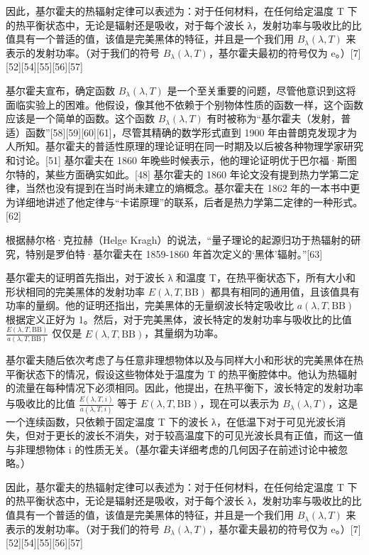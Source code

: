 因此，基尔霍夫的热辐射定律可以表述为：对于任何材料，在任何给定温度 T 下的热平衡状态中，无论是辐射还是吸收，对于每个波长 λ，发射功率与吸收比的比值具有一个普适的值，该值是完美黑体的特征，并且是一个我们用 \( B_\lambda (\lambda, T) \) 来表示的发射功率。（对于我们的符号 \( B_\lambda (\lambda, T) \)，基尔霍夫最初的符号仅为 e。）[7][52][54][55][56][57]

基尔霍夫宣布，确定函数 \( B_\lambda (\lambda, T) \) 是一个至关重要的问题，尽管他意识到这将面临实验上的困难。他假设，像其他不依赖于个别物体性质的函数一样，这个函数应该是一个简单的函数。这个函数 \( B_\lambda (\lambda, T) \) 有时被称为“基尔霍夫（发射，普适）函数”[58][59][60][61]，尽管其精确的数学形式直到 1900 年由普朗克发现才为人所知。基尔霍夫的普适性原理的理论证明在同一时期及以后被各种物理学家研究和讨论。[51] 基尔霍夫在 1860 年晚些时候表示，他的理论证明优于巴尔福·斯图尔特的，某些方面确实如此。[48] 基尔霍夫的 1860 年论文没有提到热力学第二定律，当然也没有提到在当时尚未建立的熵概念。基尔霍夫在 1862 年的一本书中更为详细地讲述了他定律与“卡诺原理”的联系，后者是热力学第二定律的一种形式。[62]

根据赫尔格·克拉赫（Helge Kragh）的说法，“量子理论的起源归功于热辐射的研究，特别是罗伯特·基尔霍夫在 1859-1860 年首次定义的‘黑体’辐射。”[63]

基尔霍夫的证明首先指出，对于波长 λ 和温度 T，在热平衡状态下，所有大小和形状相同的完美黑体的发射功率 \( E(\lambda, T, \text{BB}) \) 都具有相同的通用值，且该值具有功率的量纲。他的证明还指出，完美黑体的无量纲波长特定吸收比 \( a(\lambda, T, \text{BB}) \) 根据定义正好为 1。然后，对于完美黑体，波长特定的发射功率与吸收比的比值 \( \frac{E(\lambda, T, \text{BB})}{a(\lambda, T, \text{BB})} \) 仅仅是 \( E(\lambda, T, \text{BB}) \)，其量纲为功率。

基尔霍夫随后依次考虑了与任意非理想物体以及与同样大小和形状的完美黑体在热平衡状态下的情况，假设这些物体处于温度为 T 的热平衡腔体中。他认为热辐射的流量在每种情况下必须相同。因此，他提出，在热平衡下，波长特定的发射功率与吸收比的比值 \( \frac{E(\lambda, T, i)}{a(\lambda, T, i)} \) 等于 \( E(\lambda, T, \text{BB}) \)，现在可以表示为 \( B_\lambda (\lambda, T) \)，这是一个连续函数，只依赖于固定温度 T 下的波长 λ，在低温下对于可见光波长消失，但对于更长的波长不消失，对于较高温度下的可见光波长具有正值，而这一值与非理想物体 i 的性质无关。（基尔霍夫详细考虑的几何因子在前述讨论中被忽略。）

因此，基尔霍夫的热辐射定律可以表述为：对于任何材料，在任何给定温度 T 下的热平衡状态中，无论是辐射还是吸收，对于每个波长 λ，发射功率与吸收比的比值具有一个普适的值，该值是完美黑体的特征，并且是一个我们用 \( B_\lambda (\lambda, T) \) 来表示的发射功率。（对于我们的符号 \( B_\lambda (\lambda, T) \)，基尔霍夫最初的符号仅为 e。）[7][52][54][55][56][57]

